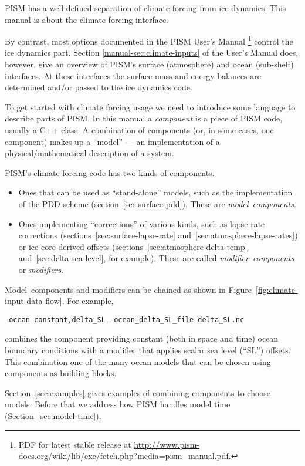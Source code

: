 \documentclass[titlepage,letterpaper,final]{scrartcl}
\begin{document}
PISM has a well-defined separation of climate forcing
from ice dynamics.  This manual is about the climate forcing interface.

By contrast, most options documented in the PISM User's Manual
\footnote{PDF for latest stable release at \url{http://www.pism-docs.org/wiki/lib/exe/fetch.php?media=pism_manual.pdf}.}
control the ice dynamics part.  Section \ref*{manual-sec:climate-inputs} of
the User's Manual does, however, give an overview
of PISM's surface (atmosphere) and ocean (sub-shelf) interfaces.  At
these interfaces the surface mass and energy balances are determined
and/or passed to the ice dynamics code.

\vspace{0.3in}

To get started with climate forcing usage we need to introduce some language to describe parts of PISM.  In this manual a
\emph{component} is a piece of PISM code, usually a C++ class. A combination of
components (or, in some cases, one component) makes up a ``model'' --- an
implementation of a physical/mathematical description of a system.

PISM's climate forcing code has two kinds of components.
\begin{itemize}
\item Ones that can be used as ``stand-alone'' models, such as the
  implementation of the PDD scheme (section~\ref{sec:surface-pdd}). These are
  \emph{model~components}.
\item Ones implementing ``corrections'' of various kinds, such as lapse rate
  corrections (sections~\ref{sec:surface-lapse-rate}
  and~\ref{sec:atmosphere-lapse-rates}) or ice-core derived offsets
  (sections~\ref{sec:atmosphere-delta-temp} and~\ref{sec:delta-sea-level}, for
  example). These are called \emph{modifier~components} or \emph{modifiers}.
\end{itemize}

Model~components and modifiers can be chained as shown in
Figure~\ref{fig:climate-input-data-flow}. For example,
\begin{verbatim}
-ocean constant,delta_SL -ocean_delta_SL_file delta_SL.nc
\end{verbatim}
combines the component providing constant (both in space and time) ocean
boundary conditions with a modifier that
applies scalar sea level (``SL'') offsets. This combination one of the many ocean models that
can be chosen using components as building blocks.

Section~\ref{sec:examples} gives examples of combining components to
choose models.  Before that we address how PISM handles model time
(Section~\ref{sec:model-time}).
\end{document}
